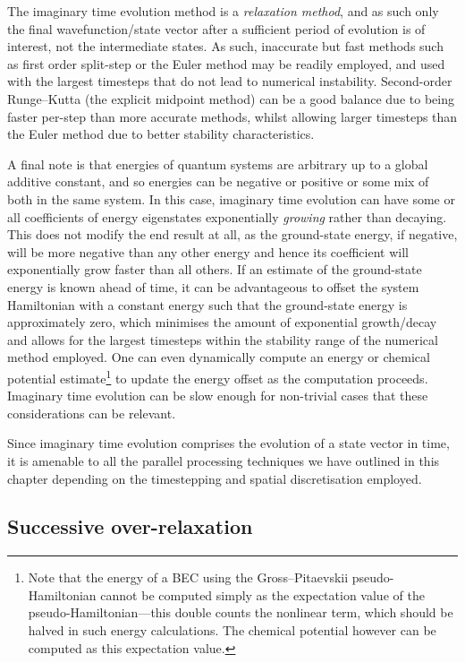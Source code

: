 The imaginary time evolution method is a \emph{relaxation method}, and as such only the final wavefunction/state vector after a sufficient period of evolution is of interest, not the intermediate states. As such, inaccurate but fast methods such as first order split-step or the Euler method may be readily employed, and used with the largest timesteps that do not lead to numerical instability. Second-order Runge--Kutta (the explicit midpoint method) can be a good balance due to being faster per-step than more accurate methods, whilst allowing larger timesteps than the Euler method due to better stability characteristics.

A final note is that energies of quantum systems are arbitrary up to a global additive constant, and so energies can be negative or positive or some mix of both in the same system. In this case, imaginary time evolution can have some or all coefficients of energy eigenstates exponentially \emph{growing} rather than decaying. This does not modify the end result at all, as the ground-state energy, if negative, will be more negative than any other energy and hence its coefficient will exponentially grow faster than all others. If an estimate of the ground-state energy is known ahead of time, it can be advantageous to offset the system Hamiltonian with a constant energy such that the ground-state energy is approximately zero, which minimises the amount of exponential growth/decay and allows for the largest timesteps within the stability range of the numerical method employed. One can even dynamically compute an energy or chemical potential estimate\footnote{Note that the energy of a BEC using the Gross--Pitaevskii pseudo-Hamiltonian cannot be computed simply as the expectation value of the pseudo-Hamiltonian---this double counts the nonlinear term, which should be halved in such energy calculations. The chemical potential however can be computed as this expectation value.} to update the energy offset as the computation proceeds. Imaginary time evolution can be slow enough for non-trivial cases that these considerations can be relevant.

Since imaginary time evolution comprises the evolution of a state vector in time, it is amenable to all the parallel processing techniques we have outlined in this chapter depending on the timestepping and spatial discretisation employed.

\subsection{Successive over-relaxation}\label{sec:SOR}

